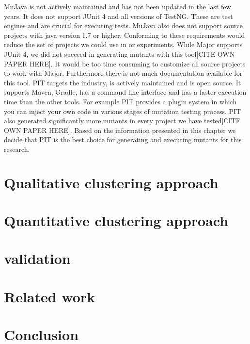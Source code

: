 \documentclass[conference,draftclsnofoot,onecolumn]{IEEEtran}
\begin{document}
MuJava is not actively maintained and has not been updated in the last few years.
It does not support JUnit 4 and all versions of TestNG\cite{mujava}.
These are test engines and are crucial for executing tests.
MuJava also does not support source projects with java version 1.7 or higher\cite{mujava}.
Conforming to these requirements would reduce the set of projects we could use in or experiments.
\newline
While Major supports JUnit 4,
we did not succeed in generating mutants with this tool[CITE OWN PAPER HERE].
It would be too time consuming to customize all source projects to work with Major.
Furthermore there is not much documentation available for this tool.
\newline
PIT targets the industry, is actively maintained and is open source\cite{Kintis2016AnalysingStudy}.
It supports Maven, Gradle, has a command line interface and has a faster execution time than the other tools.
For example PIT provides a plugin system in which you can inject your own code in various stages of mutation testing process\cite{pit}.
PIT also generated significantly more mutants in every project we have tested[CITE OWN PAPER HERE].
Based on the information presented in this chapter we decide that PIT is the best choice for generating and executing mutants for this research.


\section{Qualitative clustering approach}
\section{Quantitative clustering approach}
\section{validation}


\section{Related work}
\label{sec:rw}

\section{Conclusion}
\label{sec:conclusion}

\printbibliography[heading=bibintoc]
\end{document}
